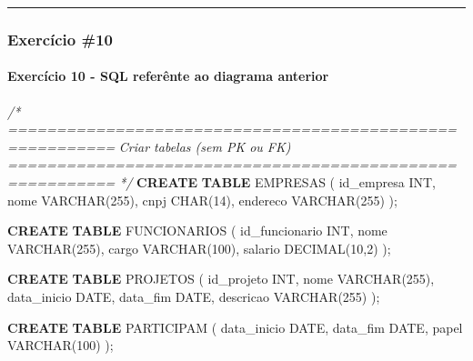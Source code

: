 \documentclass[
]{book}
\newenvironment{Shaded}{\begin{snugshade}}{\end{snugshade}}
\newcommand{\CommentTok}[1]{\textcolor[rgb]{0.56,0.35,0.01}{\textit{#1}}}
\newcommand{\DataTypeTok}[1]{\textcolor[rgb]{0.13,0.29,0.53}{#1}}
\newcommand{\DecValTok}[1]{\textcolor[rgb]{0.00,0.00,0.81}{#1}}
\newcommand{\KeywordTok}[1]{\textcolor[rgb]{0.13,0.29,0.53}{\textbf{#1}}}
\newcommand{\NormalTok}[1]{#1}
\begin{document}
\begin{center}\rule{0.5\linewidth}{0.5pt}\end{center}

\subsubsection{Exercício \#10}\label{exercuxedcio-10}



\paragraph{Exercício 10 - SQL referênte ao diagrama anterior}\label{exercuxedcio-10---sql-referuxeante-ao-diagrama-anterior}

\begin{Shaded}
\begin{Highlighting}[]
\CommentTok{/* =========================================================}
\CommentTok{   Criar tabelas (sem PK ou FK)}
\CommentTok{   ========================================================= */}
\KeywordTok{CREATE} \KeywordTok{TABLE}\NormalTok{ EMPRESAS (}
\NormalTok{    id\_empresa }\DataTypeTok{INT}\NormalTok{,}
\NormalTok{    nome }\DataTypeTok{VARCHAR}\NormalTok{(}\DecValTok{255}\NormalTok{),}
\NormalTok{    cnpj }\DataTypeTok{CHAR}\NormalTok{(}\DecValTok{14}\NormalTok{),}
\NormalTok{    endereco }\DataTypeTok{VARCHAR}\NormalTok{(}\DecValTok{255}\NormalTok{)}
\NormalTok{);}

\KeywordTok{CREATE} \KeywordTok{TABLE}\NormalTok{ FUNCIONARIOS (}
\NormalTok{    id\_funcionario }\DataTypeTok{INT}\NormalTok{,}
\NormalTok{    nome }\DataTypeTok{VARCHAR}\NormalTok{(}\DecValTok{255}\NormalTok{),}
\NormalTok{    cargo }\DataTypeTok{VARCHAR}\NormalTok{(}\DecValTok{100}\NormalTok{),}
\NormalTok{    salario }\DataTypeTok{DECIMAL}\NormalTok{(}\DecValTok{10}\NormalTok{,}\DecValTok{2}\NormalTok{)}
\NormalTok{);}

\KeywordTok{CREATE} \KeywordTok{TABLE}\NormalTok{ PROJETOS (}
\NormalTok{    id\_projeto }\DataTypeTok{INT}\NormalTok{,}
\NormalTok{    nome }\DataTypeTok{VARCHAR}\NormalTok{(}\DecValTok{255}\NormalTok{),}
\NormalTok{    data\_inicio }\DataTypeTok{DATE}\NormalTok{,}
\NormalTok{    data\_fim }\DataTypeTok{DATE}\NormalTok{,}
\NormalTok{    descricao }\DataTypeTok{VARCHAR}\NormalTok{(}\DecValTok{255}\NormalTok{)}
\NormalTok{);}

\KeywordTok{CREATE} \KeywordTok{TABLE}\NormalTok{ PARTICIPAM (}
\NormalTok{    data\_inicio }\DataTypeTok{DATE}\NormalTok{,}
\NormalTok{    data\_fim }\DataTypeTok{DATE}\NormalTok{,}
\NormalTok{    papel }\DataTypeTok{VARCHAR}\NormalTok{(}\DecValTok{100}\NormalTok{)}
\NormalTok{);}


\end{Highlighting}
\end{Shaded}
\end{document}
